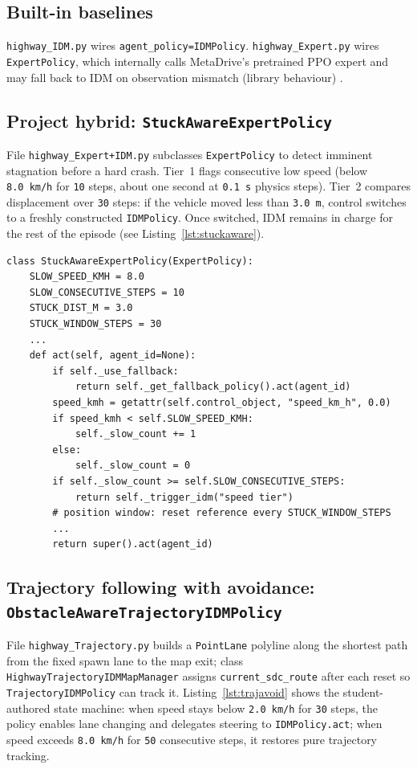 \documentclass[12pt,a4paper]{report}
\begin{document}
\subsection{Built-in baselines}
\texttt{highway\_IDM.py} wires \texttt{agent\_policy=IDMPolicy}. \texttt{highway\_Expert.py} wires \texttt{ExpertPolicy}, which internally calls MetaDrive's pretrained PPO expert and may fall back to IDM on observation mismatch (library behaviour) \cite{metadrive_docs}.

\subsection{Project hybrid: \texttt{StuckAwareExpertPolicy}}
File \texttt{highway\_Expert+IDM.py} subclasses \texttt{ExpertPolicy} to detect imminent stagnation before a hard crash. Tier~1 flags consecutive low speed (below \texttt{8.0~km/h} for \texttt{10} steps, about one second at \texttt{0.1~s} physics steps). Tier~2 compares displacement over \texttt{30} steps: if the vehicle moved less than \texttt{3.0~m}, control switches to a freshly constructed \texttt{IDMPolicy}. Once switched, IDM remains in charge for the rest of the episode (see Listing~\ref{lst:stuckaware}).

\begin{lstlisting}[caption={Excerpt: two-tier stuck detection in \texttt{StuckAwareExpertPolicy} (\texttt{highway\_Expert+IDM.py}).},label={lst:stuckaware},float=H]
class StuckAwareExpertPolicy(ExpertPolicy):
    SLOW_SPEED_KMH = 8.0
    SLOW_CONSECUTIVE_STEPS = 10
    STUCK_DIST_M = 3.0
    STUCK_WINDOW_STEPS = 30
    ...
    def act(self, agent_id=None):
        if self._use_fallback:
            return self._get_fallback_policy().act(agent_id)
        speed_kmh = getattr(self.control_object, "speed_km_h", 0.0)
        if speed_kmh < self.SLOW_SPEED_KMH:
            self._slow_count += 1
        else:
            self._slow_count = 0
        if self._slow_count >= self.SLOW_CONSECUTIVE_STEPS:
            return self._trigger_idm("speed tier")
        # position window: reset reference every STUCK_WINDOW_STEPS
        ...
        return super().act(agent_id)
\end{lstlisting}

\subsection{Trajectory following with avoidance: \texttt{ObstacleAwareTrajectoryIDMPolicy}}
File \texttt{highway\_Trajectory.py} builds a \texttt{PointLane} polyline along the shortest path from the fixed spawn lane to the map exit; class \texttt{HighwayTrajectoryIDMMapManager} assigns \texttt{current\_sdc\_route} after each reset so \texttt{TrajectoryIDMPolicy} can track it. Listing~\ref{lst:trajavoid} shows the student-authored state machine: when speed stays below \texttt{2.0~km/h} for \texttt{30} steps, the policy enables lane changing and delegates steering to \texttt{IDMPolicy.act}; when speed exceeds \texttt{8.0~km/h} for \texttt{50} consecutive steps, it restores pure trajectory tracking.
\end{document}
